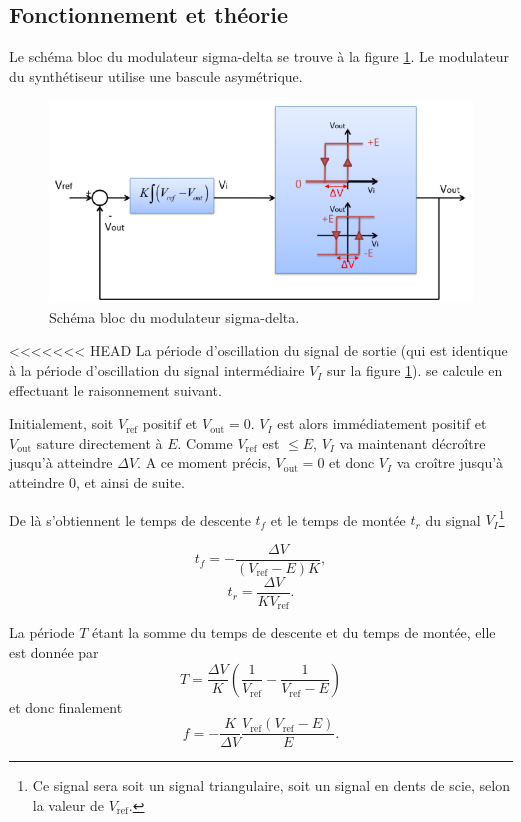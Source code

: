 

\subsection{Fonctionnement et théorie}

Le schéma bloc du modulateur sigma-delta se trouve
à la figure \ref{fig:sigma-delta-schema-blocs}. Le
modulateur du synthétiseur utilise une bascule asymétrique.

\begin{figure}[ht]
	\centering
	\includegraphics[scale=0.75]{img/schema-blocs.png}
	\caption{Schéma bloc du modulateur sigma-delta.}
	\label{fig:sigma-delta-schema-blocs}
\end{figure}

<<<<<<< HEAD
La période d'oscillation du signal de sortie (qui est 
identique à la période d'oscillation du signal intermédiaire
$V_I$ sur la figure \ref{fig:sigma-delta-schema-blocs}).
se calcule en effectuant le raisonnement suivant.

Initialement, soit $V_{\text{ref}}$  positif et
$V_{\text{out}} = 0$. $V_I$ est alors immédiatement positif
et $V_{\text{out}}$ sature directement à $E$. Comme $V_{\text{ref}}$
est $\leq E$, $V_I$ va maintenant décroître jusqu'à atteindre
$\Delta V$. A ce moment précis, $V_{\text{out}} = 0$
et donc $V_I$ va croître jusqu'à atteindre 0, et ainsi de suite.

De là s'obtiennent le temps de descente $t_f$ et le temps de montée $t_r$
du signal $V_I$\footnote{Ce signal sera soit un signal triangulaire,
soit un signal en dents de scie, selon la valeur de $V_{\text{ref}}$.}

\[ t_f = -\frac{\Delta V}{(V_{\text{ref}} - E)K},\]
\[ t_r = \frac{\Delta V}{KV_{\text{ref}}}.\]

La période $T$ étant la somme du temps de descente et du temps
de montée, elle est donnée par
\[ T = \frac{\Delta V}{K}\left(\frac{1}{V_{\text{ref}}} - \frac{1}{V_{\text{ref}} - E}\right) \]
et donc finalement
\begin{equation} 
	f = -\frac{K}{\Delta V} \frac{V_{\text{ref}}(V_{\text{ref}}-E)}{E}.
	\label{eq:sigma-delta-frequency}
\end{equation}

